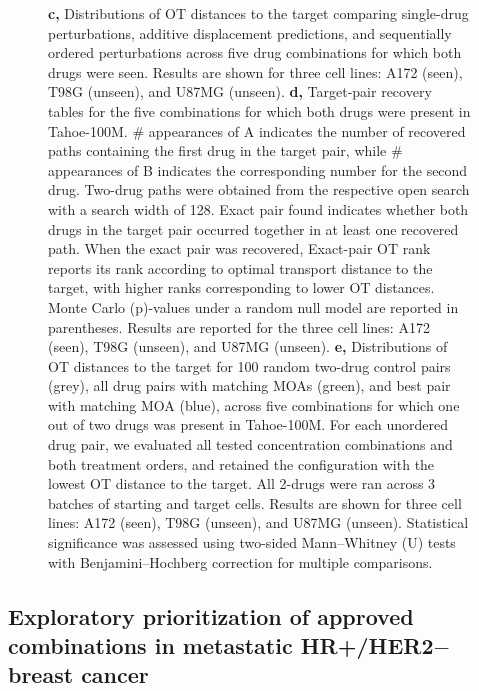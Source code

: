 \documentclass[11pt,a4paper]{article}
\begin{document}
\begin{figure}[!t]
\ContinuedFloat
\captionsetup{
    list=off,
    labelformat=figcontinued,
    labelsep=colon
}

\vspace*{-\baselineskip} %
\mbox{} %

\caption[]{
\textbf{c,} Distributions of OT distances to the target comparing single-drug perturbations, additive displacement predictions, and sequentially ordered perturbations across five drug combinations for which both drugs were seen. Results are shown for three cell lines: A172 (seen), T98G (unseen), and U87MG (unseen).
\textbf{d,} Target-pair recovery tables for the five combinations for which both drugs were present in Tahoe-100M. \# appearances of A indicates the number of recovered paths containing the first drug in the target pair, while \# appearances of B indicates the corresponding number for the second drug. Two-drug paths were obtained from the respective open search with a search width of 128. Exact pair found indicates whether both drugs in the target pair occurred together in at least one recovered path. When the exact pair was recovered, Exact-pair OT rank reports its rank according to optimal transport distance to the target, with higher ranks corresponding to lower OT distances. Monte Carlo (p)-values under a random null model are reported in parentheses. Results are reported for the three cell lines: A172 (seen), T98G (unseen), and U87MG (unseen).
\textbf{e,} Distributions of OT distances to the target for 100 random two-drug control pairs (grey), all drug pairs with matching MOAs (green), and best pair with matching MOA (blue), across five combinations for which one out of two drugs was present in Tahoe-100M. For each unordered drug pair, we evaluated all tested concentration combinations and both treatment orders, and retained the configuration with the lowest OT distance to the target. All 2-drugs were ran across 3 batches of starting and target cells. Results are shown for three cell lines: A172 (seen), T98G (unseen), and U87MG (unseen). Statistical significance was assessed using two-sided Mann–Whitney (U) tests with Benjamini–Hochberg correction for multiple comparisons.
}
\end{figure}

\FloatBarrier

\subsection{Exploratory prioritization of approved combinations in metastatic HR+/HER2$-$ breast cancer}\label{subsec6}
\end{document}
